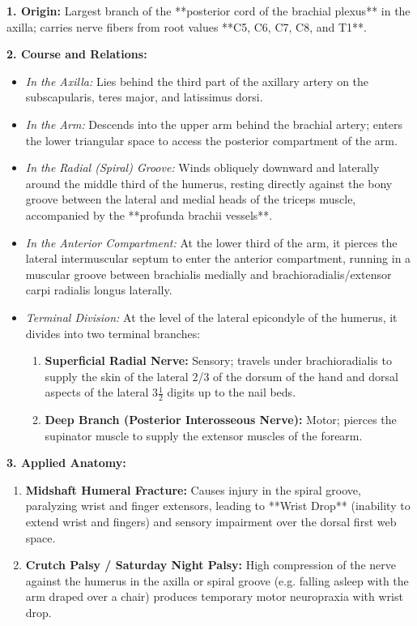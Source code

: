 \documentclass[11pt,a4paper]{article}
\begin{document}
\begin{ansbox}
\textbf{1. Origin:}
Largest branch of the **posterior cord of the brachial plexus** in the axilla; carries nerve fibers from root values **C5, C6, C7, C8, and T1**.

\textbf{2. Course and Relations:}
\begin{itemize}[leftmargin=*]
    \item \textit{In the Axilla:} Lies behind the third part of the axillary artery on the subscapularis, teres major, and latissimus dorsi.
    \item \textit{In the Arm:} Descends into the upper arm behind the brachial artery; enters the lower triangular space to access the posterior compartment of the arm.
    \item \textit{In the Radial (Spiral) Groove:} Winds obliquely downward and laterally around the middle third of the humerus, resting directly against the bony groove between the lateral and medial heads of the triceps muscle, accompanied by the **profunda brachii vessels**.
    \item \textit{In the Anterior Compartment:} At the lower third of the arm, it pierces the lateral intermuscular septum to enter the anterior compartment, running in a muscular groove between brachialis medially and brachioradialis/extensor carpi radialis longus laterally.
    \item \textit{Terminal Division:} At the level of the lateral epicondyle of the humerus, it divides into two terminal branches:
    \begin{enumerate}
        \item \textbf{Superficial Radial Nerve:} Sensory; travels under brachioradialis to supply the skin of the lateral 2/3 of the dorsum of the hand and dorsal aspects of the lateral $3\frac{1}{2}$ digits up to the nail beds.
        \item \textbf{Deep Branch (Posterior Interosseous Nerve):} Motor; pierces the supinator muscle to supply the extensor muscles of the forearm.
    \end{enumerate}
\end{itemize}

\textbf{3. Applied Anatomy:}
\begin{enumerate}[leftmargin=*]
    \item \textbf{Midshaft Humeral Fracture:} Causes injury in the spiral groove, paralyzing wrist and finger extensors, leading to **Wrist Drop** (inability to extend wrist and fingers) and sensory impairment over the dorsal first web space.
    \item \textbf{Crutch Palsy / Saturday Night Palsy:} High compression of the nerve against the humerus in the axilla or spiral groove (e.g. falling asleep with the arm draped over a chair) produces temporary motor neuropraxia with wrist drop.
\end{enumerate}
\end{ansbox}
\end{document}
